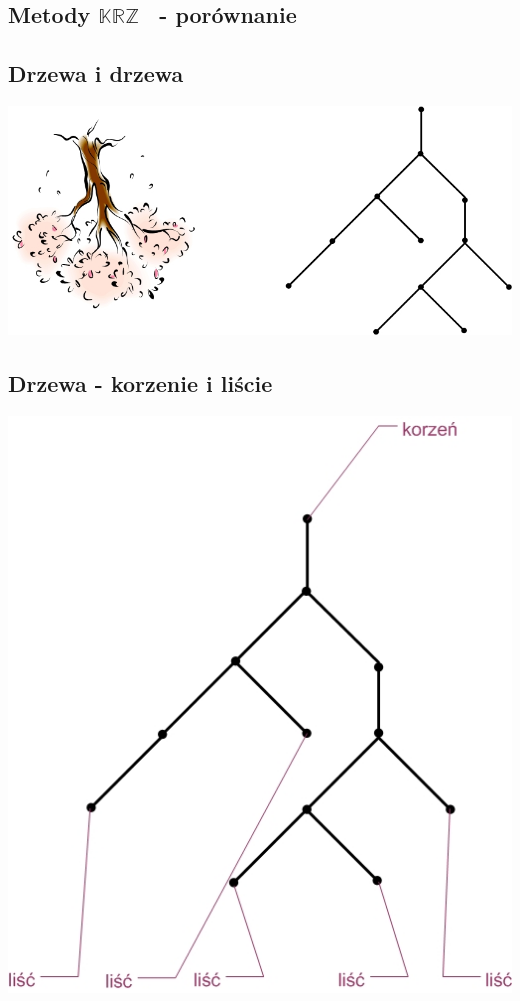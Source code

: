 \documentclass[12pt]{article}
\newcommand {\KRZ} {\ensuremath{\mathbb{KRZ}}}
\newcommand {\WRP} {\ensuremath{\mathbb{WRP}}}
\begin{document}
\subsection{Metody \KRZ~ - porównanie}
%


\subsection{Drzewa i drzewa}
%
\begin{center}
\includegraphics[width=6 cm]{../pliki_wlasne/drzewo0.jpg}
\end{center}
%


\subsection{Drzewa - korzenie i liście}
\begin{center}
\includegraphics[width=6 cm]{../pliki_wlasne/drzewo1.jpg}
\end{center}
%
\end{document}
